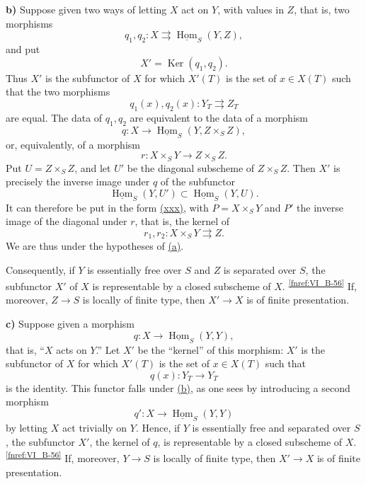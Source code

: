 \medskip
{}\label{ex:sga3-VIB-6.2.4-b}%
\noindent\textbf{b)}
Suppose given two ways of letting \(X\) act on \(Y\), with values
in \(Z\), that is, two morphisms
\[
  q_1,q_2:X\rightrightarrows
  \underline{\operatorname{Hom}}_S(Y,Z),
\]
and put
\[
  X'=\operatorname{Ker}(q_1,q_2).
\]
Thus \(X'\) is the subfunctor of \(X\) for which \(X'(T)\) is the
set of \(x\in X(T)\) such that the two morphisms
\[
  q_1(x),q_2(x):Y_T\rightrightarrows Z_T
\]
are equal. The data of \(q_1,q_2\) are equivalent to the data of
a morphism
\[
  q:X\longrightarrow
  \underline{\operatorname{Hom}}_S(Y,Z\times_S Z),
\]
or, equivalently, of a morphism
\[
  r:X\times_S Y\longrightarrow Z\times_S Z.
\]
Put \(U=Z\times_S Z\), and let \(U'\) be the diagonal subscheme
of \(Z\times_S Z\). Then \(X'\) is precisely the inverse image
under \(q\) of the subfunctor
\[
  \underline{\operatorname{Hom}}_S(Y,U')
  \subset
  \underline{\operatorname{Hom}}_S(Y,U).
\]
It can therefore be put in the form
\hyperref[eq:sga3-VIB-6.2.4-xxx]{\textup{(xxx)}}, with
\(P=X\times_S Y\) and \(P'\) the inverse image of the diagonal
under \(r\), that is, the kernel of
\[
  r_1,r_2:X\times_S Y\rightrightarrows Z.
\]
We are thus under the hypotheses of
\hyperref[ex:sga3-VIB-6.2.4-a]{\textup{(a)}}.

Consequently, if \(Y\) is essentially free over \(S\) and \(Z\)
is separated over \(S\), the subfunctor \(X'\) of \(X\) is
representable by a closed subscheme of \(X\).%
\textsuperscript{\normalfont\ref{fnref:VI_B-56}}
If, moreover, \(Z\to S\) is locally of finite type, then
\(X'\to X\) is of finite presentation.

\medskip
{}\label{ex:sga3-VIB-6.2.4-c}%
\noindent\textbf{c)}
Suppose given a morphism
\[
  q:X\longrightarrow\underline{\operatorname{Hom}}_S(Y,Y),
\]
that is, ``\(X\) acts on \(Y\).'' Let \(X'\) be the ``kernel'' of
this morphism: \(X'\) is the subfunctor of \(X\) for which
\(X'(T)\) is the set of \(x\in X(T)\) such that
\[
  q(x):Y_T\longrightarrow Y_T
\]
is the identity. This functor falls under
\hyperref[ex:sga3-VIB-6.2.4-b]{\textup{(b)}}, as one sees by
introducing a second morphism
\[
  q':X\longrightarrow\underline{\operatorname{Hom}}_S(Y,Y)
\]
by letting \(X\) act trivially on \(Y\). Hence, if \(Y\) is
essentially free and separated over \(S\), the subfunctor \(X'\),
the kernel of \(q\), is representable by a closed subscheme of
\(X\).%
\textsuperscript{\normalfont\ref{fnref:VI_B-56}}
If, moreover, \(Y\to S\) is locally of finite type, then
\(X'\to X\) is of finite presentation.

